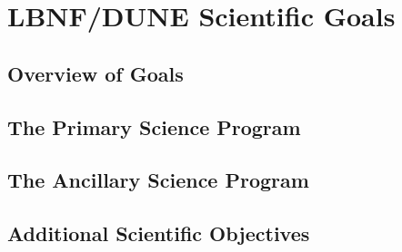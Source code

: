 \chapter{LBNF/DUNE Scientific Goals}
\label{ch:physics-goals}

\section{Overview of Goals}
\label{sec:overview-goals}



\section{The Primary Science Program}
\label{sec:prim-sci-prog}


\section{The Ancillary Science Program}
\label{sec:ancill-sci-prog}



\section{Additional Scientific Objectives}
\label{sec:addl-sci-objectives}




 

